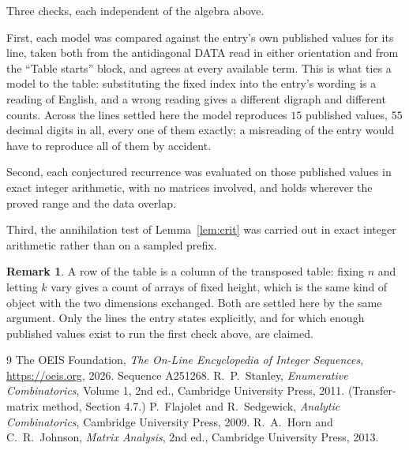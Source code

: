 \documentclass[11pt,a4paper]{article}
\theoremstyle{plain}
\theoremstyle{definition}
\newtheorem{remark}[theorem]{Remark}
\begin{document}
Three checks, each independent of the algebra above.

First, each model was compared against the entry's own published values for its line, taken
both from the antidiagonal DATA read in either orientation and from the ``Table starts''
block, and agrees at every available term. This is what ties a model to the table:
substituting the fixed index into the entry's wording is a reading of English, and a wrong
reading gives a different digraph and different counts. Across the lines settled here the
model reproduces $15$ published values, $55$ decimal digits in all, every one of
them exactly; a misreading of the entry would have to reproduce all of them by accident.

Second, each conjectured recurrence was evaluated on those published values in exact
integer arithmetic, with no matrices involved, and holds wherever the proved range and the
data overlap.

Third, the annihilation test of Lemma~\ref{lem:crit} was carried out in exact integer
arithmetic rather than on a sampled prefix.

\begin{remark}
A row of the table is a column of the transposed table: fixing $n$ and letting $k$ vary gives a
count of arrays of fixed height, which is the same kind of object with the two dimensions
exchanged. Both are settled here by the same argument. Only the lines the entry states
explicitly, and for which enough published values exist to run the first check above, are
claimed.
\end{remark}

\begin{thebibliography}{9}
 The OEIS Foundation, \emph{The On-Line Encyclopedia of Integer
Sequences}, \url{https://oeis.org}, 2026. Sequence A251268.
 R.~P.~Stanley, \emph{Enumerative Combinatorics}, Volume 1, 2nd ed.,
Cambridge University Press, 2011. (Transfer-matrix method, Section 4.7.)
 P.~Flajolet and R.~Sedgewick, \emph{Analytic Combinatorics}, Cambridge
University Press, 2009.
 R.~A.~Horn and C.~R.~Johnson, \emph{Matrix Analysis}, 2nd ed., Cambridge
University Press, 2013.
\end{thebibliography}
\end{document}
